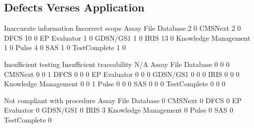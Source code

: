 \documentclass{article}
\begin{document}
\subsection{Defects Verses Application}

\begin{Schunk}
\begin{Soutput}
                       Inaccurate information Incorrect scope
  Assay File Database                       2               0
  CMSNext                                   2               0
  DFCS                                     10               0
  EP Evaluator                              1               0
  GDSN/GS1                                  1               0
  IRIS                                     13               0
  Knowledge Management                      1               0
  Pulse                                     4               0
  SAS                                       1               0
  TestComplete                              1               0
                      
                       Insufficient testing Insufficient traceability N/A
  Assay File Database                     0                         0   0
  CMSNext                                 0                         0   1
  DFCS                                    0                         0   0
  EP Evaluator                            0                         0   0
  GDSN/GS1                                0                         0   0
  IRIS                                    0                         0   0
  Knowledge Management                    0                         0   1
  Pulse                                   0                         0   0
  SAS                                     0                         0   0
  TestComplete                            0                         0   0
                      
                       Not compliant with procedure
  Assay File Database                             0
  CMSNext                                         0
  DFCS                                            0
  EP Evaluator                                    0
  GDSN/GS1                                        0
  IRIS                                            3
  Knowledge Management                            0
  Pulse                                           0
  SAS                                             0
  TestComplete                                    0
                      

\end{Soutput}
\end{Schunk}
\end{document}
